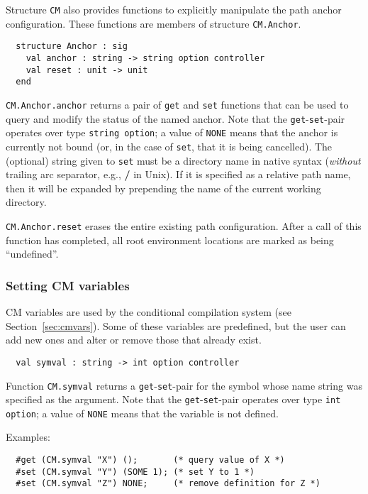 \documentclass[titlepage,letterpaper]{article}
\begin{document}
Structure {\tt CM} also provides functions to explicitly manipulate
the path anchor configuration.  These functions are members of
structure {\tt CM.Anchor}.

\begin{verbatim}
  structure Anchor : sig
    val anchor : string -> string option controller
    val reset : unit -> unit
  end
\end{verbatim}

{\tt CM.Anchor.anchor} returns a pair of {\tt get} and {\tt set}
functions that can be used to query and modify the status of the named
anchor.  Note that the {\tt get}-{\tt set}-pair operates over type
{\tt string option}; a value of {\tt NONE} means that the anchor is
currently not bound (or, in the case of {\tt set}, that it is being
cancelled).  The (optional) string given to {\tt set} must be a
directory name in native syntax ({\em without} trailing arc separator,
e.g., {\bf /} in Unix).  If it is specified as a relative path name,
then it will be expanded by prepending the name of the current working
directory.

{\tt CM.Anchor.reset} erases the entire existing path configuration.
After a call of this function has completed, all root environment
locations are marked as being ``undefined''.

\subsubsection{Setting CM variables}

CM variables are used by the conditional compilation system (see
Section~\ref{sec:cmvars}).  Some of these variables are predefined,
but the user can add new ones and alter or remove those that already
exist.

\begin{verbatim}
  val symval : string -> int option controller
\end{verbatim}

Function {\tt CM.symval} returns a {\tt get}-{\tt set}-pair for the
symbol whose name string was specified as the argument.  Note that the
{\tt get}-{\tt set}-pair operates over type {\tt int option}; a value
of {\tt NONE} means that the variable is not defined.

\noindent Examples:
\begin{verbatim}
  #get (CM.symval "X") ();       (* query value of X *)
  #set (CM.symval "Y") (SOME 1); (* set Y to 1 *)
  #set (CM.symval "Z") NONE;     (* remove definition for Z *)
\end{verbatim}
\end{document}
